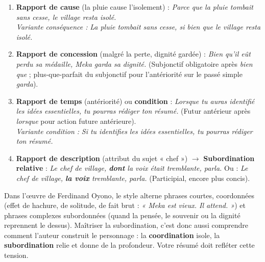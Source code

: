 \documentclass[11pt]{article}
\begin{document}
\begin{corrige}
\begin{enumerate}
\item \textbf{Rapport de cause} (la pluie cause l'isolement) : \emph{Parce que la pluie tombait sans cesse, le village resta isolé.} \\
\textit{Variante conséquence :} \emph{La pluie tombait sans cesse, si bien que le village resta isolé.}
\item \textbf{Rapport de concession} (malgré la perte, dignité gardée) : \emph{Bien qu'il eût perdu sa médaille, Meka garda sa dignité.} (Subjonctif obligatoire après \emph{bien que} ; plus-que-parfait du subjonctif pour l'antériorité sur le passé simple \emph{garda}).
\item \textbf{Rapport de temps} (antériorité) ou \textbf{condition} : \emph{Lorsque tu auras identifié les idées essentielles, tu pourras rédiger ton résumé.} (Futur antérieur après \emph{lorsque} pour action future antérieure). \\
\textit{Variante condition :} \emph{Si tu identifies les idées essentielles, tu pourras rédiger ton résumé.}
\item \textbf{Rapport de description} (attribut du sujet « chef ») $\rightarrow$ \textbf{Subordination relative} : \emph{Le chef de village, \textbf{dont} la voix était tremblante, parla.} Ou : \emph{Le chef de village, \textbf{la voix} tremblante, parla.} (Participial, encore plus concis).
\end{enumerate}
\end{corrige}

\begin{savaistu}
Dans l'œuvre de Ferdinand Oyono, le style alterne phrases courtes, coordonnées (effet de hachure, de solitude, de fait brut : \emph{« Meka est vieux. Il attend. »}) et phrases complexes subordonnées (quand la pensée, le souvenir ou la dignité reprennent le dessus). Maîtriser la subordination, c'est donc aussi comprendre comment l'auteur construit le personnage : la \textbf{coordination} isole, la \textbf{subordination} relie et donne de la profondeur. Votre résumé doit refléter cette tension.
\end{savaistu}
\end{document}
